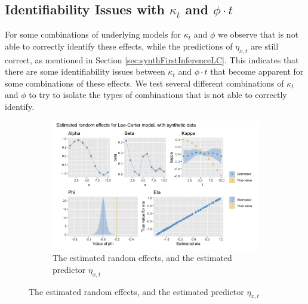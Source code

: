 \subsection{Identifiability Issues with $\kappa_t$ and $\phi\cdot t$}
\label{sec:IdentifiabilityKappa}
For some combinations of underlying models for $\kappa_t$ and $\phi$ we observe that \inlabru is not able to correctly identify these effects, while the predictions of $\eta_{x,t}$ are still correct, as mentioned in Section \ref{sec:synthFirstInferenceLC}. This indicates that there are some identifiability issues between $\kappa_t$ and $\phi \cdot t$ that become apparent for some combinations of these effects. We test several different combinations of $\kappa_t$ and $\phi$ to try to isolate the types of combinations that \inlabru is not able to correctly identify.
\begin{figure}[h!]
    \centering
    \begin{subfigure}[b]{0.85\textwidth}
        \includegraphics[width=\textwidth]{synthetic-data/Figures/effects-LC-synthetic-identifiability.png}
        \caption{The estimated random effects, and the estimated predictor $\eta_{x,t}$}
        \label{fig:unidentifiabilityKappa-top}
    \end{subfigure}
    

\end{figure}
